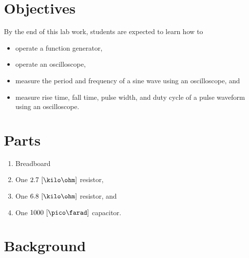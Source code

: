 \section{Objectives}
By the end of this lab work, students are expected to learn how to 

\begin{itemize}
\item operate a function generator,
\item operate an oscilloscope,
  
\item measure the period and frequency of a sine wave using an oscilloscope, and 
  
\item measure rise time, fall time, pulse width, and duty cycle of a pulse waveform using an oscilloscope.
  

\end{itemize}

\section{Parts}
\label{sec:partsEx5}

\begin{enumerate}
\item Breadboard    
\item One $2.7~[\kilo\ohm]$ resistor, 
\item One $6.8~[\kilo\ohm]$ resistor, and 
  
\item One $1000~[\pico\farad]$ capacitor. 
\end{enumerate}

\section{Background}
\label{sec:background}

